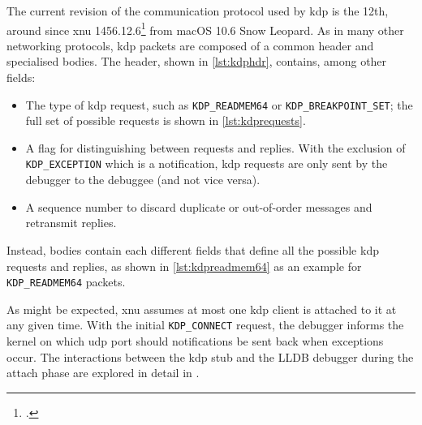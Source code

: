 The current revision of the communication protocol used by \gls{kdp} is the 12th, around since \gls{xnu} 1456.12.6\footcite{XNU1456126} from macOS 10.6 Snow Leopard. As in many other networking protocols, \gls{kdp} packets are composed of a common header and specialised bodies. The header, shown in \cref{lst:kdphdr}, contains, among other fields:
\begin{itemize}
    \item The type of \gls{kdp} request, such as \lstinline{KDP_READMEM64} or \lstinline{KDP_BREAKPOINT_SET}; the full set of possible requests is shown in \cref{lst:kdprequests}.
    \item A flag for distinguishing between requests and replies. With the exclusion of \lstinline{KDP_EXCEPTION} which is a notification, \gls{kdp} requests are only sent by the debugger to the debuggee (and not vice versa).
    \item A sequence number to discard duplicate or out-of-order messages and retransmit replies.
\end{itemize}


Instead, bodies contain each different fields that define all the possible \gls{kdp} requests and replies, as shown in \cref{lst:kdpreadmem64} as an example for \lstinline{KDP_READMEM64} packets.


As might be expected, \gls{xnu} assumes at most one \gls{kdp} client is attached to it at any given time. With the initial \lstinline{KDP_CONNECT} request, the debugger informs the kernel on which \gls{udp} port should notifications be sent back when exceptions occur. The interactions between the \gls{kdp} stub and the LLDB debugger during the attach phase are explored in detail in .


